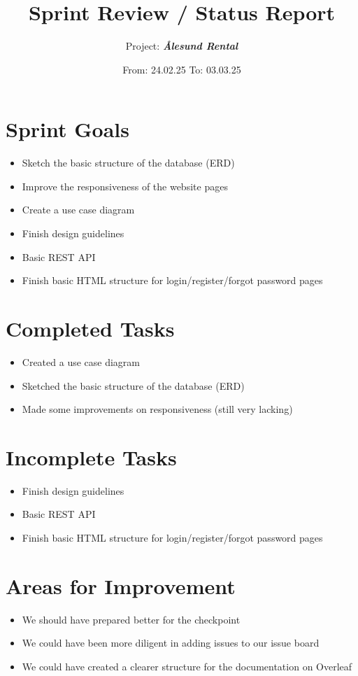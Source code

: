 \documentclass[a4paper,12pt]{article}
\title{Sprint Review / Status Report}
\author{Project: \textbf{\textit{\AA lesund Rental}}}
\date{From: 24.02.25 \quad To: 03.03.25}
\begin{document}
\maketitle

\section{Sprint Goals}
\begin{itemize}
    \item Sketch the basic structure of the database (ERD)
    \item Improve the responsiveness of the website pages
    \item Create a use case diagram
    \item Finish design guidelines
    \item Basic REST API
    \item Finish basic HTML structure for login/register/forgot password pages
\end{itemize}

\section{Completed Tasks}
\begin{itemize}
    \item Created a use case diagram
    \item Sketched the basic structure of the database (ERD)
    \item Made some improvements on responsiveness (still very lacking)
\end{itemize}

\section{Incomplete Tasks}
\begin{itemize}
    \item Finish design guidelines
    \item Basic REST API
    \item Finish basic HTML structure for login/register/forgot password pages
\end{itemize}

\section{Areas for Improvement}
\begin{itemize}
    \item We should have prepared better for the checkpoint
    \item We could have been more diligent in adding issues to our issue board
    \item We could have created a clearer structure for the documentation on Overleaf
\end{itemize}
\end{document}
